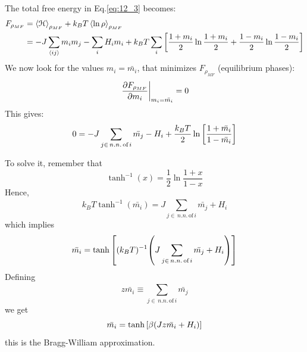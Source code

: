 \documentclass[../main/main.tex]{subfiles}
\begin{document}
The total free energy in Eq.\eqref{eq:12_3} becomes:
\begin{equation}
\begin{split}
  F_{\rho _{MF}} &= \expval{\mathcal{H}}_{\rho _{MF}} + k_B T \expval{\ln{\rho } }_{\rho _{MF}} \\
  & = - J \sum_{\expval{ij} }^{} m_i m_j - \sum_{i}^{} H_i m_i
  + k_B T   \sum_{i}^{} \qty[ \frac{1+m_i}{2} \ln{\frac{1+m_i}{2}} + \frac{1-m_i}{2} \ln{\frac{1-m_i}{2}} ]
\end{split}
\end{equation}
We now look for the values \( m_i = \bar{m_i}  \), that minimizes \( F_{\rho _{MF}} \) (equilibrium phases):
\begin{equation*}
 \eval{ \pdv{F_{\rho _{MF}} }{m_i} }_{m_i = \bar{m_i} } = 0
\end{equation*}
This gives:
\begin{equation*}
  0 = - J \sum_{j \in \, n.n. \,\text{of}\, i}^{} \bar{m_j} - H_i + \frac{k_B T}{2} \ln{\qty[\frac{1+\bar{m_i} }{1- \bar{m_i} }] }
\end{equation*}

To solve it, remember that
\begin{equation*}
  \tanh^{-1} (x) = \frac{1}{2} \ln{\frac{1+x}{1-x}} 
\end{equation*}
Hence,
\begin{equation*}
  k_B T \tanh^{-1} ( \bar{m_i} ) = J \sum_{j \in \, n.n. \,\text{of}\, i}^{} \bar{m_j} + H_i
\end{equation*}
which implies
\begin{equation*}
  \bar{m_i} = \tanh \qty[(k_B T)^{-1} \qty(J \sum_{j \in \, n.n. \,\text{of}\, i}^{} \bar{m_j} + H_i ) ]
\end{equation*}
Defining
\begin{equation*}
  z \bar{m_i} \equiv  \sum_{j \in \, n.n. \,\text{of}\, i}^{} \bar{m_j}
\end{equation*}
we get
\begin{equation}
  \bar{m_i} = \tanh \qty[\beta \qty(Jz \bar{m_i} +H_i) ]
\end{equation}
this is the Bragg-William approximation.
\end{document}
